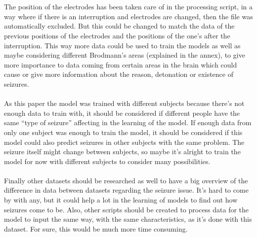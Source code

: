 \\\\
The position of the electrodes has been taken care of in the processing script, in a way where if there is an interruption and electrodes are changed, then the file was automatically excluded. But this could be changed to match the data of the previous positions of the electrodes and the positions of the one’s after the interruption. This way more data could be used to train the models as well as maybe considering different Brodmann’s areas (explained in the annex), to give more importance to data coming from certain areas in the brain which could cause or give more information about the reason, detonation or existence of seizures.
\\\\
As this paper the model was trained with different subjects because there’s not enough data to train with, it should be considered if different people have the same “type of seizure” affecting in the learning of the model. If enough data from only one subject was enough to train the model, it should be considered if this model could also predict seizures in other subjects with the same problem. The seizure itself might change between subjects, so maybe it’s alright to train the model for now with different subjects to consider many possibilities. 
\\\\
Finally other datasets should be researched as well to have a big overview of the difference in data between datasets regarding the seizure issue. It’s hard to come by with any, but it could help a lot in the learning of models to find out how seizures come to be. Also, other scripts should be created to process data for the model to input the same way, with the same characteristics, as it’s done with this dataset. For sure, this would be much more time consuming.
\\

